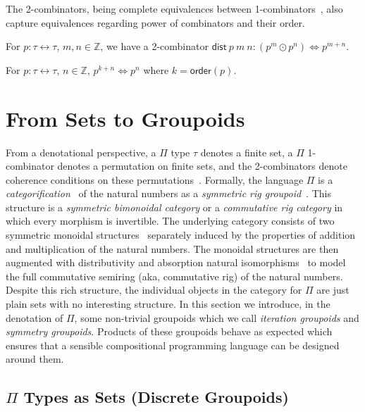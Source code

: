 \documentclass[a4paper,USenglish]{lipics-v2016-utf8x}
\newcommand{\iso}{\leftrightarrow}
\newcommand{\isotwo}{\Leftrightarrow}
\newcommand{\ord}[1]{\ensuremath{\mathsf{order}(#1)}}
\newcommand{\Z}{\mathbb{Z}}
\newcommand{\distiterplus}[3]{\mathsf{dist}~#1~#2~#3}
\begin{document}
The 2-combinators, being complete equivalences between
1-combinators~\cite{Carette2016}, also capture equivalences regarding
power of combinators and their order.

\begin{lemma}
\label{lem:distiterplus}
  For $p : \tau\iso\tau$, $m,n\in\Z$, we have a 2-combinator
  $\distiterplus{p}{m}{n} : (p^m \odot p^n) \isotwo p ^{m + n}$.
\end{lemma}

\begin{lemma}
\label{lem:ordercancel}
  For $p : \tau \iso \tau$, $n \in \Z$, $p^{k + n} \isotwo p^n$ where
  $k = \ord{p}$.
\end{lemma}

\section{From Sets to Groupoids}
\label{sec:groupoids}

From a denotational perspective, a $\Pi$ type $\tau$ denotes a finite set, a $\Pi$ 1-combinator denotes a permutation on finite sets, and the 2-combinators denote coherence conditions on these permutations~\cite{Carette2016}. Formally, the language $\Pi$ is a \emph{categorification}~\cite{math/9802029} of the natural numbers as a \emph{symmetric rig groupoid}~\cite{nlabrig}. This structure is a \emph{symmetric bimonoidal category} or a \emph{commutative rig category} in which every morphism is invertible. The underlying category consists of two symmetric monoidal structures~\cite{nla.cat-vn1051288} separately induced by the properties of addition and multiplication of the natural numbers. The monoidal structures are then augmented with distributivity and absorption natural isomorphisms~\cite{laplaza} to model the full commutative semiring (aka, commutative rig) of the natural numbers. Despite this rich structure, the individual objects in the category for $\Pi$ are just plain sets with no interesting structure. In this section we introduce, in the denotation of $\Pi$, some non-trivial groupoids which we call \emph{iteration groupoids} and \emph{symmetry groupoids}. Products of these groupoids behave as expected which ensures that a sensible compositional programming language can be designed around them.

\subsection{$\Pi$ Types as Sets (Discrete Groupoids)}
\end{document}
